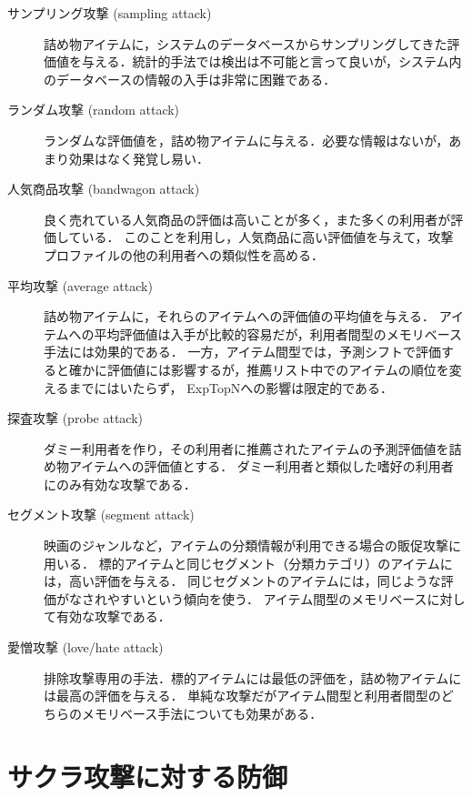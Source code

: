 \begin{description}
\item[サンプリング攻撃 (sampling attack)]
詰め物アイテムに，システムのデータベースからサンプリングしてきた評価値を与える．統計的手法では検出は不可能と言って良いが，システム内のデータベースの情報の入手は非常に困難である．
\item[ランダム攻撃 (random attack)]
ランダムな評価値を，詰め物アイテムに与える\cite{www:04:01}．必要な情報はないが，あまり効果はなく発覚し易い．
\item[人気商品攻撃 (bandwagon attack)]
良く売れている人気商品の評価は高いことが多く，また多くの利用者が評価している．
このことを利用し，人気商品に高い評価値を与えて，攻撃プロファイルの他の利用者への類似性を高める\cite{jacm:04:02}．
\item[平均攻撃 (average attack)]
詰め物アイテムに，それらのアイテムへの評価値の平均値を与える\cite{www:04:01}．
アイテムへの平均評価値は入手が比較的容易だが，利用者間型のメモリベース手法には効果的である．
一方，アイテム間型では，予測シフトで評価すると確かに評価値には影響するが，推薦リスト中でのアイテムの順位を変えるまでにはいたらず， ExpTopNへの影響は限定的である．
\item[探査攻撃 (probe attack)]
ダミー利用者を作り，その利用者に推薦されたアイテムの予測評価値を詰め物アイテムへの評価値とする\cite{ieeem:07:07}．
ダミー利用者と類似した嗜好の利用者にのみ有効な攻撃である．
\item[セグメント攻撃 (segment attack)]
映画のジャンルなど，アイテムの分類情報が利用できる場合の販促攻撃に用いる\cite{icdm:05:06}．
標的アイテムと同じセグメント（分類カテゴリ）のアイテムには，高い評価を与える．
同じセグメントのアイテムには，同じような評価がなされやすいという傾向を使う．
アイテム間型のメモリベースに対して有効な攻撃である．
\item[愛憎攻撃 (love/hate attack)]
排除攻撃専用の手法．標的アイテムには最低の評価を，詰め物アイテムには最高の評価を与える\cite{kdd:06:01}．
単純な攻撃だがアイテム間型と利用者間型のどちらのメモリベース手法についても効果がある．
\end{description}

\section{サクラ攻撃に対する防御}
\label{sec:shilling:defence}

